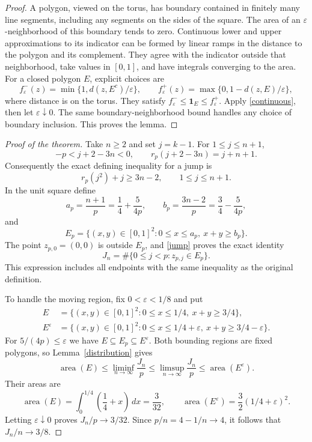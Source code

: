 \documentclass[11pt]{article}
\begin{document}
\begin{proof}
A polygon, viewed on the torus, has boundary contained in finitely many
line segments, including any segments on the sides of the square.
The area of an \(\varepsilon\)-neighborhood of this boundary tends
to zero. Continuous lower and upper approximations to its indicator
can be formed by linear ramps in the distance to the polygon and its
complement. They agree with the indicator outside that neighborhood,
take values in \([0,1]\), and have integrals converging to the area.
For a closed polygon \(E\), explicit choices are
\[
 f^-_\varepsilon(z)=\min\{1,d(z,E^c)/\varepsilon\},\qquad
 f^+_\varepsilon(z)=\max\{0,1-d(z,E)/\varepsilon\},
\]
where distance is on the torus. They satisfy
\(f^-_\varepsilon\le\mathbf1_E\le f^+_\varepsilon\).
Apply \eqref{continuous}, then let \(\varepsilon\downarrow0\).
The same boundary-neighborhood bound handles any choice of boundary
inclusion. This proves the lemma.
\end{proof}

\begin{proof}[Proof of the theorem]
Take \(n\ge2\) and set \(j=k-1\). For \(1\le j\le n+1\),
\[
 -p<j+2-3n<0,\qquad
 r_p(j+2-3n)=j+n+1.
\]
Consequently the exact defining inequality for a jump is
\begin{equation}\label{jump}
 r_p(j^2)+j\ge3n-2,\qquad 1\le j\le n+1.
\end{equation}
In the unit square define
\[
 a_p=\frac{n+1}{p}=\frac14+\frac5{4p},\qquad
 b_p=\frac{3n-2}{p}=\frac34-\frac5{4p},
\]
and
\[
 E_p=\{(x,y)\in[0,1]^2:0\le x\le a_p,\ x+y\ge b_p\}.
\]
The point \(z_{p,0}=(0,0)\) is outside \(E_p\), and
\eqref{jump} proves the exact identity
\[
 J_n=\#\{0\le j<p:z_{p,j}\in E_p\}.
\]
This expression includes all endpoints with the same inequality as
the original definition.

To handle the moving region, fix \(0<\varepsilon<1/8\) and put
\begin{align*}
 E&=\{(x,y)\in[0,1]^2:0\le x\le1/4,\ x+y\ge3/4\},\\
 E^\varepsilon
 &=\{(x,y)\in[0,1]^2:0\le x\le1/4+\varepsilon,\
                                  x+y\ge3/4-\varepsilon\}.
\end{align*}
For \(5/(4p)\le\varepsilon\) we have
\(E\subseteq E_p\subseteq E^\varepsilon\).
Both bounding regions are fixed polygons, so Lemma~\ref{distribution}
gives
\[
 \operatorname{area}(E)\le
 \liminf_{n\to\infty}\frac{J_n}{p}
 \le\limsup_{n\to\infty}\frac{J_n}{p}
 \le\operatorname{area}(E^\varepsilon).
\]
Their areas are
\[
 \operatorname{area}(E)=\int_0^{1/4}\left(\frac14+x\right)\,dx
                      =\frac3{32},\qquad
 \operatorname{area}(E^\varepsilon)=\frac32(1/4+\varepsilon)^2.
\]
Letting \(\varepsilon\downarrow0\) proves \(J_n/p\to3/32\).
Since \(p/n=4-1/n\to4\), it follows that \(J_n/n\to3/8\).
\end{proof}
\end{document}
